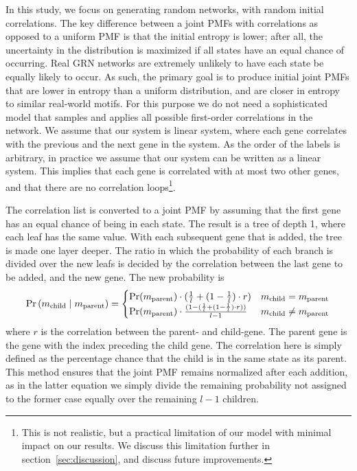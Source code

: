 \documentclass[../main.tex]{subfiles}
\begin{document}
In this study, we focus on generating random networks, with random initial correlations.
The key difference between a joint PMFs with correlations as opposed to a uniform PMF is that the initial entropy is lower; after all, the uncertainty in the distribution is maximized if all states have an equal chance of occurring.
Real GRN networks are extremely unlikely to have each state be equally likely to occur.
As such, the primary goal is to produce initial joint PMFs that are lower in entropy than a uniform distribution, and are closer in entropy to similar real-world motifs.
For this purpose we do not need a sophisticated model that samples and applies all possible first-order correlations in the network.
We assume that our system is linear system, where each gene correlates with the previous and the next gene in the system.
As the order of the labels is arbitrary, in practice we assume that our system can be written as a linear system.
This implies that each gene is correlated with at most two other genes, and that there are no correlation loops\footnote{This is not realistic, but a practical limitation of our model with minimal impact on our results. We discuss this limitation further in section~\ref{sec:discussion}, and discuss future improvements.}.

The correlation list is converted to a joint PMF by assuming that the first gene has an equal chance of being in each state.
The result is a tree of depth 1, where each leaf has the same value.
With each subsequent gene that is added, the tree is made one layer deeper.
The ratio in which the probability of each branch is divided over the new leafs is decided by the correlation between the last gene to be added, and the new gene.
The new probability is
%
\begin{equation}
\label{parentchild}
 \Pr\left( m_\mathrm{child} \;\middle|\; m_\mathrm{parent} \right) =
    \begin{cases}
    \Pr(m_\mathrm{parent}) \cdot (\frac{1}{l} + (1 - \frac{1}{l}) \cdot r) &  m_\mathrm{child} = m_\mathrm{parent} \\
    \Pr(m_\mathrm{parent}) \cdot \frac{(1 - (\frac{1}{l} + (1 - \frac{1}{l}) \cdot r))}{l-1} &  m_\mathrm{child} \neq m_\mathrm{parent} \\
    \end{cases}
\end{equation}
%
where $r$ is the correlation between the parent- and child-gene.
The parent gene is the gene with the index preceding the child gene.
The correlation here is simply defined as the percentage chance that the child is in the same state as its parent.
This method ensures that the joint PMF remains normalized after each addition, as in the latter equation we simply divide the remaining probability not assigned to the former case equally over the remaining $l-1$ children.
\end{document}
